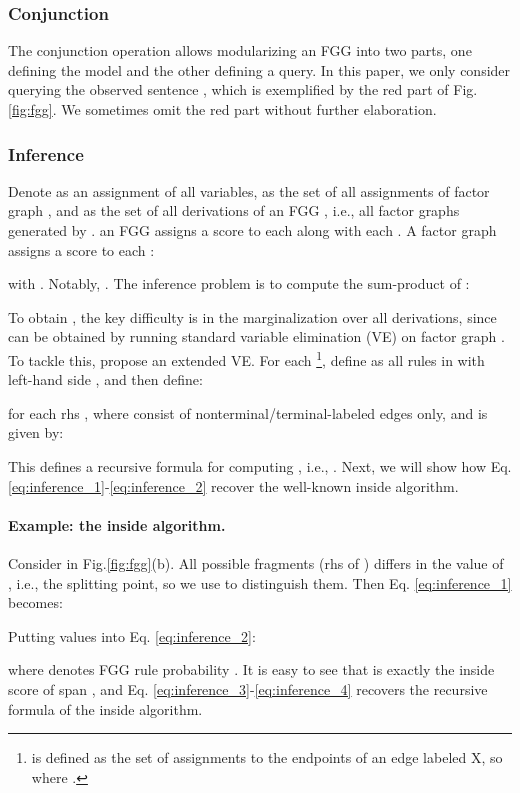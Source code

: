 \documentclass[11pt]{article}
\begin{document}
\subsubsection{Conjunction}
The conjunction operation  \cite[][{Sec. 4}]{DBLP:conf/nips/0001R20} allows modularizing an FGG into two parts, one defining the model and the other defining a query. In this paper, we only consider querying the observed sentence  , 
which is exemplified by the red part of Fig. \ref{fig:fgg}. We sometimes omit the red part without further elaboration.

\subsubsection{Inference} 
  Denote  as an assignment of all variables,  as the set of all assignments of factor graph ,  and  as the set of all derivations of an FGG , i.e., all factor graphs generated by . 
an FGG  assigns a score  to each   along with each . A factor graph  assigns a score  to each :

with .  Notably, . The inference problem is to compute the sum-product of :

To obtain , the key difficulty is in the marginalization over all derivations, since  can be obtained by running standard variable elimination (VE) on factor graph . To tackle this, \citet[][]{DBLP:conf/nips/0001R20} propose an extended VE.
For each  \footnote{ is defined as the set of assignments to the endpoints of an edge  labeled X, so  where .}, define  as all rules in  with left-hand side , and then define:

for each rhs , where  consist of nonterminal/terminal-labeled edges only, and   is given by:


This defines a recursive formula for computing , i.e., .  Next, we will show how Eq. \ref{eq:inference_1}-\ref{eq:inference_2} recover the well-known inside algorithm.

\paragraph{Example: the inside algorithm.} 
Consider  in Fig.\ref{fig:fgg}(b). All possible fragments  (rhs of ) differs in the value of , i.e., the splitting point, so we use  to distinguish them. Then Eq. \ref{eq:inference_1} becomes:

Putting values into Eq. \ref{eq:inference_2}:

where  denotes FGG rule probability . It is easy to see that  is exactly the inside score of span , and Eq. \ref{eq:inference_3}-\ref{eq:inference_4} recovers the recursive formula of the inside algorithm.
\end{document}
